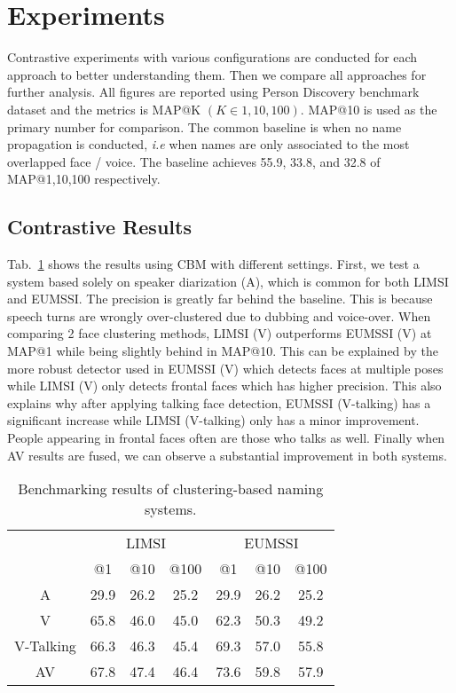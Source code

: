 \section{Experiments}
\label{sec:experiment}

Contrastive experiments with various configurations are conducted for each approach to better understanding them. Then we compare all approaches for further analysis. All figures are reported using Person Discovery benchmark dataset and the metrics is MAP@K $(K \in {1, 10, 100})$. MAP@10 is used as the primary number for comparison.
%
The common baseline is when no name propagation is conducted, \emph{i.e} when names are only associated to the most overlapped face / voice. The baseline achieves 55.9, 33.8, and 32.8 of MAP@1,10,100 respectively.

\subsection{Contrastive Results}

 Tab.~\ref{tab:clustering} shows the results using CBM with different settings. First, we test a system based solely on speaker diarization (A), which is common for both LIMSI and EUMSSI. The precision is greatly far behind the baseline. This is because speech turns are wrongly over-clustered due to dubbing and voice-over.
%
When comparing 2 face clustering methods, LIMSI (V) outperforms EUMSSI (V) at MAP@1 while being slightly behind in MAP@10. This can be explained by the more robust detector used in EUMSSI (V) which detects faces at multiple poses while LIMSI (V) only detects frontal faces which has higher precision.
%
This also explains why after applying talking face detection, EUMSSI (V-talking) has a significant increase while LIMSI (V-talking) only has a minor improvement. People appearing in frontal faces often are those who talks as well.
%
Finally when AV results are fused, we can observe a substantial improvement in both systems.

\begin{table}[tb]
\centering
\caption{Benchmarking results of clustering-based naming systems.}
\vspace*{-2mm}
\begin{tabular}{c|c|c|c|| c|c|c|}
\cline{2-7}
  &  \multicolumn{3}{|c||}{LIMSI} &  \multicolumn{3}{|c|}{EUMSSI} \\ \cline{2-7}
           & @1& @10& @100   & @1& @10& @100 \\ \hline
 \multicolumn{1}{|c|}{A} & 29.9   & 26.2   & 25.2  & 29.9   & 26.2   & 25.2\\ \hline
 \multicolumn{1}{|c|}{V} & 65.8   & 46.0   & 45.0 & 62.3   & 50.3   & 49.2 \\ \hline
 \multicolumn{1}{|c|}{V-Talking} & 66.3   & 46.3   & 45.4 & 69.3   & 57.0   & 55.8 \\ \hline
 \multicolumn{1}{|c|}{AV} & 67.8   & 47.4   & 46.4 & 73.6   & 59.8   & 57.9\\ \hline
\end{tabular}
%
\vspace*{-5mm}
\label{tab:clustering}
\end{table}



